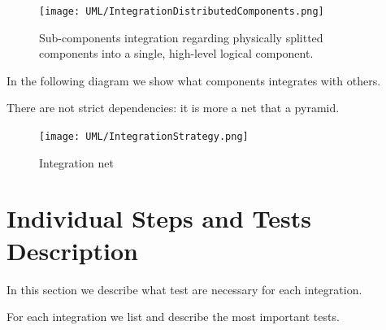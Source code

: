 \documentclass[11pt]{article} %
\begin{document}
\begin{figure}[H]
	\centering
	\texttt{[image: UML/IntegrationDistributedComponents.png]}
	\caption{Sub-components integration regarding physically splitted components into a single, high-level logical component.}
\end{figure}	

In the following diagram we show what components integrates with others.

There are not strict dependencies: it is more a net that a pyramid.

\begin{figure}[H]
	\centering
	\texttt{[image: UML/IntegrationStrategy.png]}
	\caption{Integration net}
\end{figure}	


\newpage
\section{Individual Steps and Tests Description}

In this section we describe what test are necessary for each integration.

For each integration we list and describe the most important tests.
\end{document}

